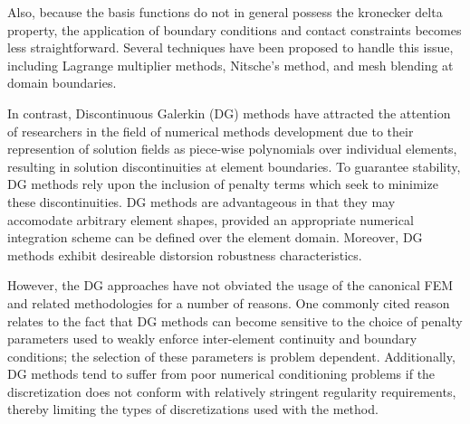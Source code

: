 		Also, because the basis functions do not in general possess the kronecker delta property, the application of boundary conditions and contact constraints becomes less straightforward. Several techniques have been proposed to handle this issue, including Lagrange multiplier methods, Nitsche's method, and mesh blending at domain boundaries.
			
		In contrast, Discontinuous Galerkin (DG) methods have attracted the attention of researchers in the field of numerical methods development due to their represention of solution fields as piece-wise polynomials over individual elements, resulting in solution discontinuities at element boundaries. To guarantee stability, DG methods rely upon the inclusion of penalty terms which seek to minimize these discontinuities. DG methods are advantageous in that they may accomodate arbitrary element shapes, provided an appropriate numerical integration scheme can be defined over the element domain. Moreover, DG methods exhibit desireable distorsion robustness characteristics.
		
		However, the DG approaches have not obviated the usage of the canonical FEM and related methodologies for a number of reasons. One commonly cited reason relates to the fact that DG methods can become sensitive to the choice of penalty parameters used to weakly enforce inter-element continuity and boundary conditions; the selection of these parameters is problem dependent. Additionally, DG methods tend to suffer from poor numerical conditioning problems if the discretization does not conform with relatively stringent regularity requirements, thereby limiting the types of discretizations used with the method.
			
